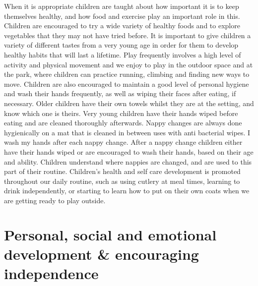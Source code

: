 \documentclass[10pt,a4paper]{report}
\begin{document}
When it is appropriate children are taught about how important it is to keep themselves healthy, and how food and exercise play an important role in this. Children are encouraged to try a wide variety of healthy foods and to explore vegetables that they may not have tried before. It is important to give children a variety of different tastes from a very young age in order for them to develop healthy habits that will last a lifetime. Play frequently involves a high level of activity and physical movement and we enjoy to play in the outdoor space and at the park, where children can practice running, climbing and finding new ways to move. Children are also encouraged to maintain a good level of personal hygiene and wash their hands frequently, as well as wiping their faces after eating, if necessary. Older children have their own towels whilst they are at the setting, and know which one is theirs. Very young children have their hands wiped before eating and are cleaned thoroughly afterwards. Nappy changes are always done hygienically on a mat that is cleaned in between uses with anti bacterial wipes. I wash my hands after each nappy change. After a nappy change children either have their hands wiped or are encouraged to wash their hands, based on their age and ability. Children understand where nappies are changed, and are used to this part of their routine. Children's health and self care development is promoted throughout our daily routine, such as using cutlery at meal times, learning to drink independently, or starting to learn how to put on their own coats when we are getting ready to play outside.

\section{Personal, social and emotional development \& encouraging independence}
\end{document}
